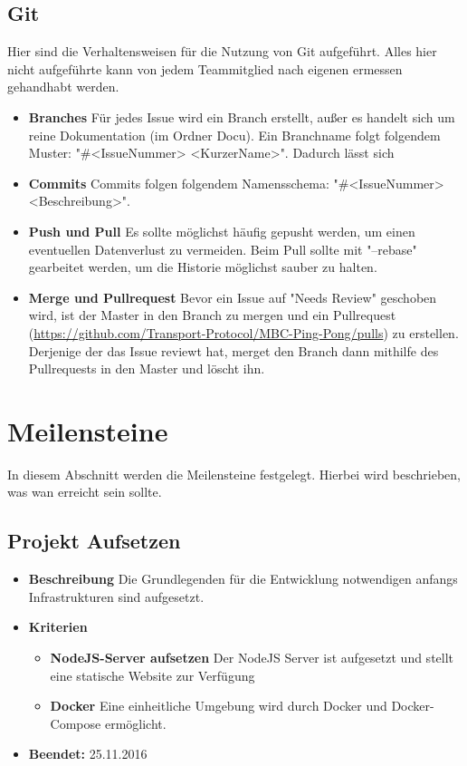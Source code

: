 \subsection{Git}
Hier sind die Verhaltensweisen für die Nutzung von Git aufgeführt. Alles hier nicht aufgeführte kann von jedem Teammitglied nach eigenen ermessen gehandhabt werden.
\begin{itemize}
	\item \textbf{Branches} \newline
	Für jedes Issue wird ein Branch erstellt, außer es handelt sich um reine Dokumentation (im Ordner Docu). Ein Branchname folgt folgendem Muster: "\#<IssueNummer> <KurzerName>". Dadurch lässt sich 
	\item \textbf{Commits} \newline
	Commits folgen folgendem Namensschema: "\#<IssueNummer> <Beschreibung>".
	\item \textbf{Push und Pull} \newline
	Es sollte möglichst häufig gepusht werden, um einen eventuellen Datenverlust zu vermeiden. Beim Pull sollte mit "--rebase" gearbeitet werden, um die Historie möglichst sauber zu halten.
	\item \textbf{Merge und Pullrequest} \newline
	Bevor ein Issue auf "Needs Review" geschoben wird, ist der Master in den Branch zu mergen und ein Pullrequest (\href{https://github.com/Transport-Protocol/MBC-Ping-Pong/pulls}{https://github.com/Transport-Protocol/MBC-Ping-Pong/pulls}) zu erstellen. Derjenige der das Issue reviewt hat, merget den Branch dann mithilfe des Pullrequests in den Master und löscht ihn.
\end{itemize}

\section{Meilensteine}
In diesem Abschnitt werden die Meilensteine festgelegt. Hierbei wird beschrieben, was wan erreicht sein sollte.
\subsection{Projekt Aufsetzen}
\begin{itemize}
	\item \textbf{Beschreibung}\newline
	Die Grundlegenden für die Entwicklung notwendigen anfangs Infrastrukturen sind aufgesetzt.
	\item \textbf{Kriterien}
	\begin{itemize}
		\item \textbf{NodeJS-Server aufsetzen} \newline
		Der NodeJS Server ist aufgesetzt und stellt eine statische Website zur Verfügung
		\item \textbf{Docker} \newline
		Eine einheitliche Umgebung wird durch Docker und Docker-Compose ermöglicht.
	\end{itemize}
	\item \textbf{Beendet:} 25.11.2016
\end{itemize}


